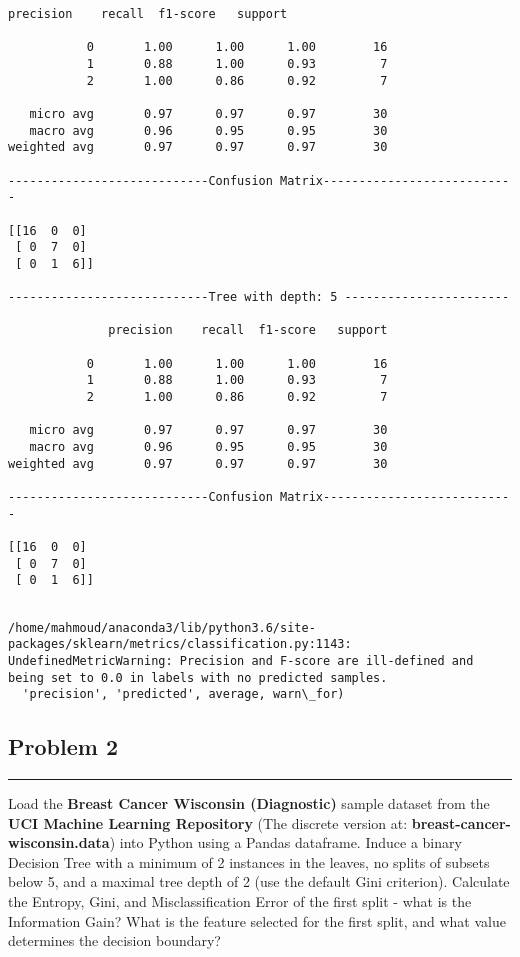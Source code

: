 \documentclass[11pt]{article}
\begin{document}
\begin{Verbatim}[commandchars=\\\{\}]
              precision    recall  f1-score   support

           0       1.00      1.00      1.00        16
           1       0.88      1.00      0.93         7
           2       1.00      0.86      0.92         7

   micro avg       0.97      0.97      0.97        30
   macro avg       0.96      0.95      0.95        30
weighted avg       0.97      0.97      0.97        30

----------------------------Confusion Matrix---------------------------

[[16  0  0]
 [ 0  7  0]
 [ 0  1  6]]

----------------------------Tree with depth: 5 -----------------------

              precision    recall  f1-score   support

           0       1.00      1.00      1.00        16
           1       0.88      1.00      0.93         7
           2       1.00      0.86      0.92         7

   micro avg       0.97      0.97      0.97        30
   macro avg       0.96      0.95      0.95        30
weighted avg       0.97      0.97      0.97        30

----------------------------Confusion Matrix---------------------------

[[16  0  0]
 [ 0  7  0]
 [ 0  1  6]]


    \end{Verbatim}

    \begin{Verbatim}[commandchars=\\\{\}]
/home/mahmoud/anaconda3/lib/python3.6/site-packages/sklearn/metrics/classification.py:1143: UndefinedMetricWarning: Precision and F-score are ill-defined and being set to 0.0 in labels with no predicted samples.
  'precision', 'predicted', average, warn\_for)

    \end{Verbatim}

    \subsection{Problem 2}\label{problem-2}

\begin{center}\rule{0.5\linewidth}{\linethickness}\end{center}

Load the \textbf{Breast Cancer Wisconsin (Diagnostic)} sample dataset
from the \textbf{UCI Machine Learning Repository} (The discrete version
at: \textbf{breast-cancer-wisconsin.data}) into Python using a Pandas
dataframe. Induce a binary Decision Tree with a minimum of 2 instances
in the leaves, no splits of subsets below 5, and a maximal tree depth of
2 (use the default Gini criterion). Calculate the Entropy, Gini, and
Misclassification Error of the first split - what is the Information
Gain? What is the feature selected for the first split, and what value
determines the decision boundary?
\end{document}

